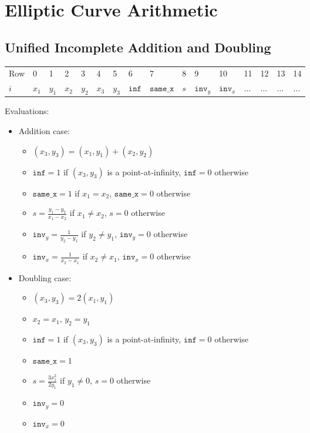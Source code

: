 \section{Elliptic Curve Arithmetic}
\label{section:ec}

\subsection{Unified Incomplete Addition and Doubling}

\begin{center}
    \begin{table}[H]
        \begin{tabular}{llllllllllllllll}
            Row   & 0     & 1     & 2     & 3     & 4     & 5     & 6   & 7       & 8       & 9       & 10      & 11      & 12      & 13      & 14      \\
            $i$ & $x_1$ & $y_1$ & $x_2$ & $y_2$ & $x_3$ & $y_3$ & $\texttt{inf}$ & $\texttt{same\_x}$ & $s$ & $\texttt{inv}_y$ & $\texttt{inv}_x$ & $\dots$ & $\dots$ & $\dots$ & $\dots$ \\
        \end{tabular}
    \end{table}
\end{center}

Evaluations:
\begin{itemize}
	\item Addition case:
	\begin{itemize}
		\item $(x_3, y_3) = (x_1, y_1) + (x_2, y_2)$
		\item $\texttt{inf} = 1$ if $(x_3, y_3)$ is a point-at-infinity, $\texttt{inf} = 0$ otherwise
		\item $\texttt{same\_x} = 1$ if $x_1 = x_2$, $\texttt{same\_x} = 0$ otherwise
		\item $s = \frac{y_1 - y_2}{x_1 - x_2}$ if $x_1 \neq x_2$, $s = 0$ otherwise
		\item $\texttt{inv}_y = \frac{1}{y_2 - y_1}$ if $y_2 \neq y_1$, $\texttt{inv}_y = 0$ otherwise 
		\item $\texttt{inv}_x = \frac{1}{x_2 - x_1}$ if $x_2 \neq x_1$, $\texttt{inv}_x= 0$ otherwise
	\end{itemize}
	\item Doubling case:
	\begin{itemize}
		\item $(x_3, y_3) = 2(x_1, y_1)$
		\item $x_2 = x_1$, $y_2 = y_1$
		\item $\texttt{inf} = 1$ if $(x_3, y_3)$ is a point-at-infinity, $\texttt{inf} = 0$ otherwise
		\item $\texttt{same\_x} = 1$
		\item $s = \frac{3x_1^2}{2y_1}$ if $y_1 \neq 0$, $s = 0$ otherwise
		\item $\texttt{inv}_y = 0$ 
		\item $\texttt{inv}_x= 0$
	\end{itemize}
\end{itemize}


